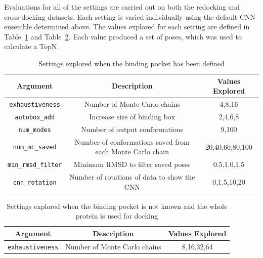 \documentclass[journal=jcisd8,manuscript=article]{achemso}
\begin{document}
Evaluations for all of the settings are carried out on both the redocking and cross-docking datasets. Each setting is varied individually using the default CNN ensemble determined above. The values explored for each setting are defined in Table~\ref{tab:SettingsExplPocket} and Table~\ref{tab:SettingsExplWP}. Each value produced a set of poses, which was used to calculate a TopN.
\begin{table}[]
    \centering
    \begin{tabular}{|c|c|c|}
        \hline Argument & Description & Values Explored \\ \hline
         \texttt{exhaustiveness} & Number of Monte Carlo chains & 4,8,16 \\ \hline
         \texttt{autobox\_add} & Increase size of binding box & 2,4,6,8 \\ \hline
         \texttt{num\_modes} & Number of output conformations & 9,100 \\ \hline
         \texttt{num\_mc\_saved} & Number of conformations saved from each Monte Carlo chain & 20,40,60,80,100 \\ \hline
         \texttt{min\_rmsd\_filter} & Minimum RMSD to filter saved poses & 0.5,1.0,1.5 \\ \hline
         \texttt{cnn\_rotation} & Number of rotations of data to show the CNN & 0,1,5,10,20 \\ \hline
    \end{tabular}
    \caption{Settings explored when the binding pocket has been defined}
    \label{tab:SettingsExplPocket}
\end{table}
\begin{table}[]
    \centering
    \begin{tabular}{|c|c|c|}
        \hline Argument & Description & Values Explored \\ \hline
         \texttt{exhaustiveness} & Number of Monte Carlo chains & 8,16,32,64 \\ \hline
    \end{tabular}
    \caption{Settings explored when the binding pocket is not known and the whole protein is used for docking}
    \label{tab:SettingsExplWP}
\end{table}
\end{document}
